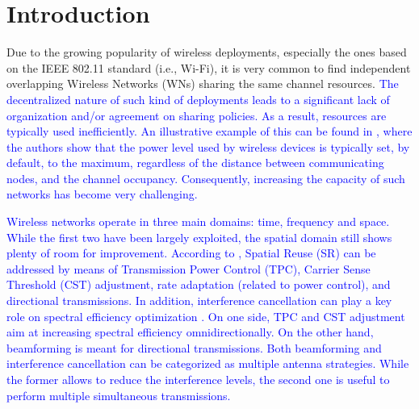 \documentclass[preprint,12pt]{elsarticle}
\begin{document}
	
	\newpage
	
	\section{Introduction}
	\label{section:introduction}
	Due to the growing popularity of wireless deployments, especially the ones based on the IEEE 802.11 standard (i.e., Wi-Fi), it is very common to find independent overlapping Wireless Networks (WNs) sharing the same channel resources. \textcolor{blue}{The decentralized nature of such kind of deployments leads to a significant lack of organization and/or agreement on sharing policies. As a result, resources are typically used inefficiently. An illustrative example of this can be found in \cite{akella2007self}, where the authors show that the power level used by wireless devices is typically set, by default, to the maximum, regardless of the distance between communicating nodes, and the channel occupancy. Consequently, increasing the capacity of such networks has become very challenging.}
	
	\textcolor{blue}{Wireless networks operate in three main domains: time, frequency and space. While the first two have been largely exploited, the spatial domain still shows plenty of room for improvement. According to \cite{alawieh2009improving}, Spatial Reuse (SR) can be addressed by means of Transmission Power Control (TPC), Carrier Sense Threshold (CST) adjustment, rate adaptation (related to power control), and directional transmissions. In addition, interference cancellation can play a key role on spectral efficiency optimization \cite{miridakis2013survey}. On one side, TPC and CST adjustment aim at increasing spectral efficiency omnidirectionally. On the other hand, beamforming is meant for directional transmissions. Both beamforming and interference cancellation can be categorized as multiple antenna strategies. While the former allows to reduce the interference levels, the second one is useful to perform multiple simultaneous transmissions.}
	
\end{document}
